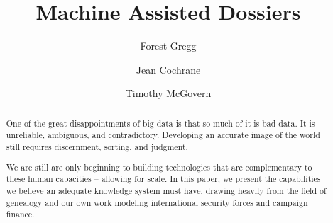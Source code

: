 \documentclass[format=siggraph, review=true]{acmart}
\title{Machine Assisted Dossiers}
\author{Forest Gregg}
\affiliation{DataMade}
\author{Jean Cochrane}
\affiliation{DataMade}
\author{Timothy McGovern}
\begin{document}
\begin{abstract}One of the great disappointments of big data is that so much
  of it is bad data. It is unreliable, ambiguous, and
  contradictory. Developing an accurate image of the world still
  requires discernment, sorting, and judgment.

  We are still are only beginning to building technologies that are
  complementary to these human capacities -- allowing for
  scale.  In this paper, we present the capabilities we believe an
  adequate knowledge system must have, drawing heavily from the field
  of genealogy and our own work modeling international security forces
  and campaign finance.
\end{abstract}

\maketitle
\end{document}
